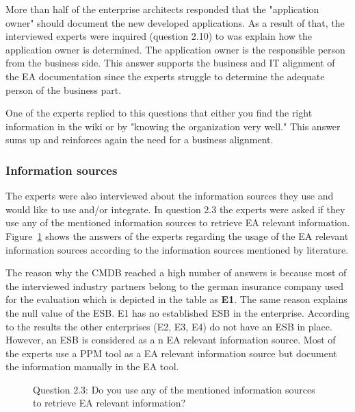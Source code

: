 More than half of the enterprise architects responded that the "application owner" should document the new developed applications.
As a result of that, the interviewed experts were inquired (question 2.10) to was explain how the application owner is determined. The application owner is the responsible person from the business side. This answer supports the business and IT alignment of the EA documentation since the experts struggle to determine the adequate person of the business part.

One of the experts replied to this questions that either you find the right information in the wiki or by "knowing the organization very well." This answer sums up and reinforces again the need for a business alignment.

\subsubsection{Information sources}

The experts were also interviewed about the information sources they use and would like to use and/or integrate.
In question 2.3 the experts were asked if they use any of the mentioned information sources to retrieve EA relevant information.
Figure~\ref{fig:question23} shows the answers of the experts regarding the usage of the EA relevant information sources according to the information sources mentioned by literature. \cite{Farwick2013}

The reason why the CMDB reached a high number of answers is because most of the interviewed industry partners belong to the german insurance company used for the evaluation which is depicted in the table as \textbf{E1}. The same reason explains the null value of the ESB. E1 has no established ESB in the enterprise. According to the results the other enterprises (E2, E3, E4) do not have an ESB in place. However, an ESB is considered as a n EA relevant information source. \cite{Hauder2013}
Most of the experts use a PPM tool as a EA relevant information source but document the information manually in the EA tool.

\begin{figure}[htpb]
\centering
{}
\caption{Question 2.3: Do you use any of the mentioned information sources to retrieve EA relevant information?}
\label{fig:question23}
\end{figure}


